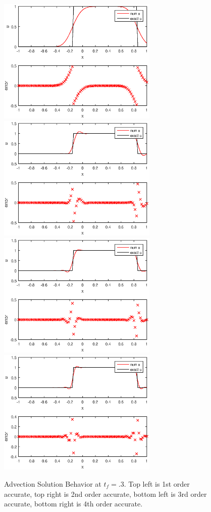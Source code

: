 \begin{figure}[h]
\centering
\includegraphics[width=3in]{unsmooth1}
\includegraphics[width=3in]{unsmooth2}\\
\includegraphics[width=3in]{unsmooth3}
\includegraphics[width=3in]{unsmooth4}
\caption{Advection Solution Behavior at $t_f=.3.$ Top left is 1st order accurate, top right is 2nd order accurate, bottom left is 3rd order accurate, bottom right is 4th order accurate.}
\end{figure}



